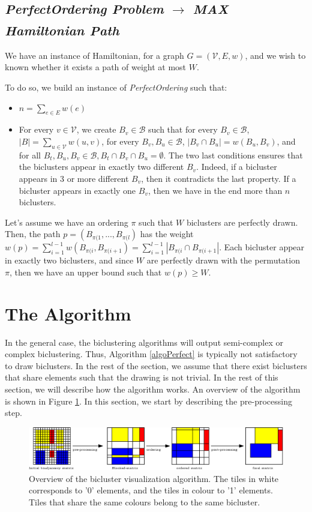 \documentclass[twoside,leqno,twocolumn]{article}
\theoremstyle{definition}
\begin{document}
\subsection*{\textit{PerfectOrdering Problem} $\xrightarrow[]{}$ \textit{MAX Hamiltonian Path}}

We have an instance of Hamiltonian, for a graph $G = (\mathcal{V},E,w)$, and we wish to known whether it exists a path of weight at most $W$.

\noindent To do so, we build an instance of \textit{PerfectOrdering} such that:
\begin{itemize}
    \item $n=\sum_{e\in E}w(e)$
    \item For every $v\in \mathcal{V}$, we create $B_v \in \mathcal{B}$ such that for every $B_v \in \mathcal{B}$, $|B| = \sum_{u\in \mathcal{V}}w(u,v)$, for every $B_v, B_u \in \mathcal{B}$, $|B_v \cap B_u| = w(B_u,B_v)$, and for all $B_t, B_u, B_v \in \mathcal{B}, B_t \cap B_v \cap B_u = \emptyset$. The two last conditions ensures that the biclusters appear in exactly two different $B_v$. Indeed, if a bicluster appears in 3 or more different $B_v$, then it contradicts the last property. If a bicluster appears in exactly one $B_v$, then we have in the end more than $n$ biclusters.
\end{itemize}
\noindent Let's assume we have an ordering $\pi$ such that $W$ biclusters are perfectly drawn. Then, the path $p = (B_{\pi(1},...,B_{\pi(l})$ has the weight $w(p) = \sum_{i=1}^{l-1}w(B_{\pi(i},B_{\pi(i+1}) =  \sum_{i=1}^{l-1}|B_{\pi(i} \cap B_{\pi(i+1}|$. Each bicluster appear in exactly two biclusters, and since $W$ are perfectly drawn with the permutation $\pi$, then we have an upper bound such that $w(p) \geq W$.

\section{The Algorithm}
\noindent In the general case, the biclustering algorithms will output semi-complex or complex biclustering. Thus, Algorithm \ref{algoPerfect} is typically not satisfactory to draw biclusters. In the rest of the section, we assume that there exist biclusters that share elements such that the drawing is not trivial. In the rest of this section, we will describe how the algorithm works. An overview of the algorithm is shown in Figure \ref{fig:overview}. In this section, we start by describing the pre-processing step.

\begin{figure}
    \centering
    \includegraphics[width=\textwidth]{figures/algorithmOverview.eps}
    \caption{Overview of the bicluster visualization algorithm. The tiles in white corresponds to '0' elements, and the tiles in colour to '1' elements. Tiles that share the same colours belong to the same bicluster.}
    \label{fig:overview}
\end{figure}
\end{document}
